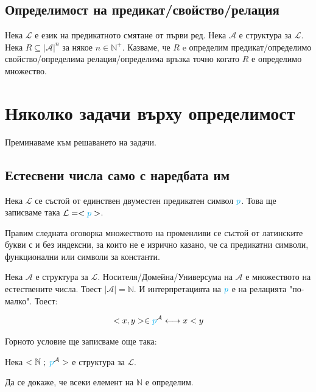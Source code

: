 \documentclass{article}[12pt]
\newcommand{\Lang}{\mathcal{L}}
\begin{document}
\subsection{Определимост на предикат/свойство/релация}
Нека \(\Lang\) е език на предикатното смятане от първи ред. Нека \(\mathcal{A}\) е структура за \(\Lang\).
Нека \(R \subseteq |\mathcal{A}|^n\) за някое \(n \in \mathbb{N}^+\).
Казваме, че \(R\) e определим предикат/определимо свойство/определима релация/определима връзка точно когато
\(R\) е определимо множество.

\section{Няколко задачи върху определимост}

Преминаваме към решаването на задачи.

\subsection{Естесвени числа само с наредбата им}

Нека \(\Lang\) се състой от единствен двуместен предикатен символ \(\color{cyan} p\).
Това ще записваме така \(\Lang = <\color{cyan} p \color{black} >\).

\vspace{0.5cm}

Правим следната оговорка множеството на променливи се състой от латинските букви с и без индексни,
за които не е изрично казано, че са предикатни символи, функционални или символи за константи.

\vspace{0.5cm}
Нека \(\mathcal{A}\) е структура за \(\Lang\).
Носителя/Домейна/Универсума на \(\mathcal{A}\)
е множеството на естествените числа. Тоест \(|\mathcal{A}| = \mathbb{N}\).
И интерпретацията на \(\color{cyan} p\) е на релацията "по-малко".
Тоест:

\begin{align*}
<x, y> \in \color{cyan} p^{\color{black} \mathcal{A}} \color{black} \longleftrightarrow x < y
\end{align*}

Горното условие ще записваме още така:

Нека \(<\mathbb{N} \; ; \; \color{cyan} p^{\color{black} \mathcal{A}} \color{black} > \) е структура за \(\Lang\).

\vspace{0.5cm}

Да се докаже, че всеки елемент на \(\mathbb{N}\) е определим.
\end{document}

